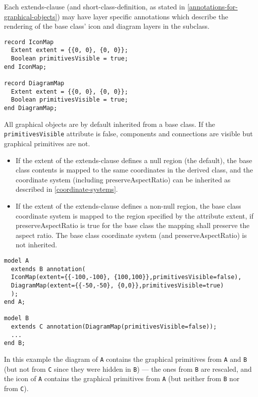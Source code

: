 Each extends-clause (and short-class-definition, as stated in \cref{annotations-for-graphical-objects})
may have layer specific annotations which describe
the rendering of the base class' icon and diagram layers in the
subclass.

\begin{lstlisting}[language=modelica]
record IconMap
  Extent extent = {{0, 0}, {0, 0}};
  Boolean primitivesVisible = true;
end IconMap;

record DiagramMap
  Extent extent = {{0, 0}, {0, 0}};
  Boolean primitivesVisible = true;
end DiagramMap;
\end{lstlisting}
All graphical objects are by default inherited from a base class. If the
\lstinline!primitivesVisible! attribute is false, components and connections are
visible but graphical primitives are not.

\begin{itemize}
\item
  If the extent of the extends-clause defines a null region (the
  default), the base class contents is mapped to the same coordinates in
  the derived class, and the coordinate system (including
  preserveAspectRatio) can be inherited as described in
  \cref{coordinate-systems}.
\item
  If the extent of the extends-clause defines a non-null region, the
  base class coordinate system is mapped to the region specified by the
  attribute extent, if preserveAspectRatio is true for the base class
  the mapping shall preserve the aspect ratio. The base class coordinate
  system (and preserveAspectRatio) is not inherited.
\end{itemize}

\begin{example}
\begin{lstlisting}[language=modelica]
model A
  extends B annotation(
  IconMap(extent={{-100,-100}, {100,100}},primitivesVisible=false),
  DiagramMap(extent={{-50,-50}, {0,0}},primitivesVisible=true)
  );
end A;

model B
  extends C annotation(DiagramMap(primitivesVisible=false));
  ...
end B;
\end{lstlisting}
In this example the diagram of \lstinline!A! contains the graphical primitives
from \lstinline!A! and \lstinline!B! (but not from \lstinline!C! since they were hidden in \lstinline!B!) --- the ones
from \lstinline!B! are rescaled, and the icon of \lstinline!A! contains the graphical primitives
from \lstinline!A! (but neither from \lstinline!B! nor from \lstinline!C!).
\end{example}

